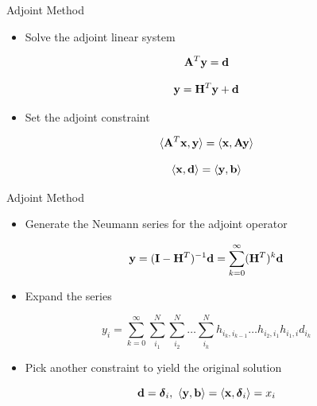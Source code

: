 \documentclass{beamer}
\begin{document}
\begin{frame}{Adjoint Method}

  \begin{itemize}
  \item Solve the adjoint linear system
  \end{itemize}

  \[
  \mathbf{A}^T \mathbf{y} = \mathbf{d}
  \]

  \[
  \mathbf{y} = \mathbf{H}^T \mathbf{y} + \mathbf{d}
  \]

  \medskip
  \begin{itemize}
  \item Set the adjoint constraint
  \end{itemize}

  \[
  \langle \mathbf{A}^T \mathbf{x}, \mathbf{y} \rangle = \langle \mathbf{x}, \mathbf{A}
  \mathbf{y} \rangle
  \]

  \[
  \langle \mathbf{x}, \mathbf{d} \rangle = \langle \mathbf{y}, \mathbf{b} \rangle
  \]
  
\end{frame}

\begin{frame}{Adjoint Method}

  \begin{itemize}
  \item Generate the Neumann series for the adjoint operator
  \end{itemize}

  \[
  \mathbf{y} = (\mathbf{I} - \mathbf{H}^T)^{-1} \mathbf{d} = \sum_{k=0}^{\infty}
  (\mathbf{H}^T)^k\mathbf{d}
  \]

  \medskip
  \begin{itemize}
  \item Expand the series
  \end{itemize}

  \[
  y_i = \sum_{k=0}^{\infty}\sum_{i_1}^{N}\sum_{i_2}^{N}\ldots
  \sum_{i_k}^{N}h_{i_k,i_{k-1}}\ldots h_{i_2,i_1} h_{i_1,i} d_{i_k}
  \]

  \medskip
  \begin{itemize}
  \item Pick another constraint to yield the original solution
  \end{itemize}

  \[
  \mathbf{d} = \boldsymbol{\delta}_i,\ \langle \mathbf{y}, \mathbf{b} \rangle =
  \langle \mathbf{x}, \boldsymbol{\delta}_i \rangle = x_i
  \]
  
\end{frame}
\end{document}
